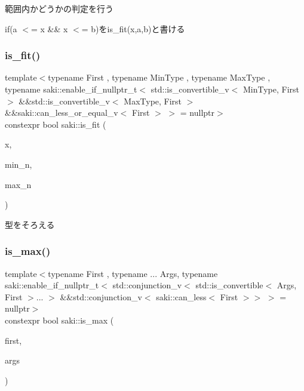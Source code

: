 範囲内かどうかの判定を行う 

if(a $<$= x \&\& x $<$= b)をis\+\_\+fit(x,a,b)と書ける \mbox{\label{namespacesaki_a09478d8cb01d75e93d34f884d7133dc9}} 
\subsubsection{\texorpdfstring{is\+\_\+fit()}{is\_fit()}\hspace{0.1cm}{\footnotesize\ttfamily [2/2]}}
{\footnotesize\ttfamily template$<$typename First , typename Min\+Type , typename Max\+Type , typename saki\+::enable\+\_\+if\+\_\+nullptr\+\_\+t$<$ std\+::is\+\_\+convertible\+\_\+v$<$ Min\+Type, First $>$ \&\&std\+::is\+\_\+convertible\+\_\+v$<$ Max\+Type, First $>$ \&\&saki\+::can\+\_\+less\+\_\+or\+\_\+equal\+\_\+v$<$ First $>$ $>$  = nullptr$>$ \\
constexpr bool saki\+::is\+\_\+fit (\begin{DoxyParamCaption}\item[{First}]{x,  }\item[{Min\+Type}]{min\+\_\+n,  }\item[{Max\+Type}]{max\+\_\+n }\end{DoxyParamCaption})}



型をそろえる 

\mbox{\label{namespacesaki_a48b234a435a0e21df1507c4786b975b8}} 
\subsubsection{\texorpdfstring{is\+\_\+max()}{is\_max()}}
{\footnotesize\ttfamily template$<$typename First , typename ... Args, typename saki\+::enable\+\_\+if\+\_\+nullptr\+\_\+t$<$ std\+::conjunction\+\_\+v$<$ std\+::is\+\_\+convertible$<$ Args, First $>$... $>$ \&\&std\+::conjunction\+\_\+v$<$ saki\+::can\+\_\+less$<$ First $>$$>$ $>$  = nullptr$>$ \\
constexpr bool saki\+::is\+\_\+max (\begin{DoxyParamCaption}\item[{const First \&}]{first,  }\item[{const Args \&...}]{args }\end{DoxyParamCaption})}



